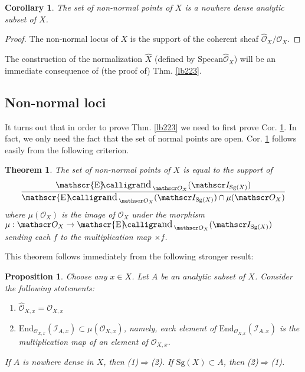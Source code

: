 \documentclass[12pt,b5paper,notitlepage]{report}
\theoremstyle{definition}
\theoremstyle{plain}
\newtheorem{thm}[df]{Theorem}
\newtheorem{pp}[df]{Proposition}
\newtheorem{co}[df]{Corollary}
\DeclareMathOperator{\send}{\mathscr{E}\text{\kern -3pt {\calligra\large nd}}\,}
\newcommand{\wht}{\widehat}
\newcommand{\End}{\mathrm{End}} %
\newcommand{\scr}{\mathscr}
\newcommand{\Specan}{\mathrm{Specan}}
\newcommand{\Sg}{\mathrm{Sg}}
\newcommand{\Owht}{\widehat{\scr O}}
\numberwithin{equation}{section}
\begin{document}
\begin{co}\label{lb224}
The set of non-normal points of $X$ is a nowhere dense analytic subset of $X$.
\end{co}

\begin{proof}
The non-normal locus of $X$ is the support of the coherent sheaf $\Owht_X/\scr O_X$.
\end{proof}

The construction of the normalization $\wht X$ (defined by $\Specan\Owht_X$) will be an immediate consequence of (the proof of) Thm. \ref{lb223}.

\subsection{Non-normal loci}


It turns out that in order to prove Thm. \ref{lb223} we need to first prove Cor. \ref{lb224}. In fact, we only need the fact that the set of normal points are open. Cor. \ref{lb224} follows easily from the following criterion.


\begin{thm}\label{lb227}
The set of non-normal points of $X$ is equal to the support of
\begin{align*}
\frac{\send_{\scr O_X}(\scr I_{\Sg(X)})}{\send_{\scr O_X}(\scr I_{\Sg(X)})\cap\mu(\scr O_X)}
\end{align*}
where $\mu(\scr O_X)$ is the image of $\scr O_X$ under the morphism $\mu:\scr O_X\rightarrow\send_{\scr O_X}(\scr I_{\Sg(X)})$ sending each $f$ to the multiplication map $\times f$.
\end{thm}

This theorem follows immediately from the following stronger result:

\begin{pp}\label{lb362}
Choose any $x\in X$. Let $A$ be an analytic subset of $X$. Consider the following statements:
\begin{enumerate}[label=(\arabic*)]
\item $\Owht_{X,x}=\scr O_{X,x}$
\item $\displaystyle\End_{\scr O_{X,x}}(\scr I_{A,x})\subset \mu(\scr O_{X,x})$, namely, each element of $\End_{\scr O_{X,x}}(\scr I_{A,x})$ is the multiplication map of an element of $\scr O_{X,x}$.
\end{enumerate}
If $A$ is nowhere dense in $X$, then (1)$\Rightarrow$(2). If $\Sg(X)\subset A$, then (2)$\Rightarrow$(1).
\end{pp}
\end{document}

